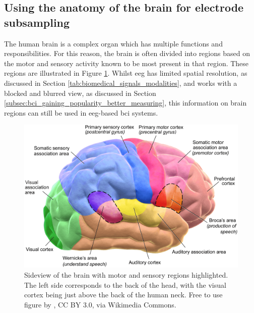 
\subsection{Using the anatomy of the brain for electrode subsampling}
\label{subsec:biomedical_signals_working_with_eeg_anatomy}

The human brain is a complex organ which has multiple functions and responsibilities.
For this reason, the brain is often divided into regions based on the motor and sensory activity known to be most present in that region.
These regions are illustrated in Figure \ref{fig:biomedical_signals_brain_regions}.
Whilst \gls{eeg} has limited spatial resolution, as discussed in Section \ref{tab:biomedical_signals_modalities}, and works with a blocked and blurred view, as discussed in Section \ref{subsec:bci_gaining_popularity_better_measuring}, this information on brain regions can still be used in \gls{eeg}-based \gls{bci} systems.

\begin{figure}[ht]
    \centering
    \includegraphics[width=0.8\linewidth]{../images/biosignals/brain_areas.pdf}
    \captionsetup{width=0.85\linewidth}
    \captionsetup{justification=centering}
    \caption{Sideview of the brain with motor and sensory regions highlighted. The left side corresponds to the back of the head, with the visual cortex being just above the back of the human neck. Free to use figure by \citet{figure_blausen}, CC BY 3.0, via Wikimedia Commons.}
    \label{fig:biomedical_signals_brain_regions}
\end{figure}

